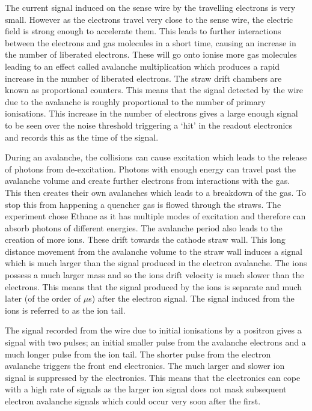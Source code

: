 The current signal induced on the sense wire by the travelling electrons is very small. However as the electrons travel very close to the sense wire, the electric field is strong enough to accelerate them. This leads to further interactions between the electrons and gas molecules in a short time, causing an increase in the number of liberated electrons. These will go onto ionise more gas molecules leading to an effect called avalanche multiplication which produces a rapid increase in the number of liberated electrons. The straw drift chambers are known as proportional counters. This means that the signal detected by the wire due to the avalanche is roughly proportional to the number of primary ionisations. This increase in the number of electrons gives a large enough signal to be seen over the noise threshold triggering a ‘hit’ in the readout electronics and records this as the time of the signal. 

During an avalanche, the collisions can cause excitation which leads to the release of photons from de-excitation. Photons with enough energy can travel past the avalanche volume and create further electrons from interactions with the gas. This then creates their own avalanches which leads to a breakdown of the gas. To stop this from happening a quencher gas is flowed through the straws. The experiment chose Ethane as it has multiple modes of excitation and therefore can absorb photons of different energies. The avalanche period also leads to the creation of more ions. These drift towards the cathode straw wall. This long distance movement from the avalanche volume to the straw wall induces a signal which is much larger than the signal produced in the electron avalanche. The ions possess a much larger mass and so the ions drift velocity is much slower than the electrons. This means that the signal produced by the ions is separate and much later (of the order of $\mu$s) after the electron signal. The signal induced from the ions is referred to as the ion tail. 

The signal recorded from the wire due to initial ionisations by a positron gives a signal with two pulses; an initial smaller pulse from the avalanche electrons and a much longer pulse from the ion tail. The shorter pulse from the electron avalanche triggers the front end electronics. The much larger and slower ion signal is suppressed by the electronics. This means that the electronics can cope with a high rate of signals as the larger ion signal does not mask subsequent electron avalanche signals which could occur very soon after the first.

